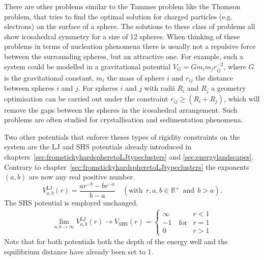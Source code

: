 There are other problems similar to the Tammes problem like the Thomson problem,
that tries to find the optimal solution for charged particles (e.g. electrons)
on the surface of a
sphere.\autocite{Wales_Structuredynamicsspherical_2006,Wales_Defectmotifsspherical_2009}
The solutions to these class of problems all show icosahedral symmetry for a
size of 12 spheres. When thinking of these problems in terms of nucleation
phenomena there is usually not a repulsive force between the surrounding
spheres, but an attractive one. For example, such a system could be modelled in
a gravitational potential $V_G=Gm_im_jr_{ij}^{-2}$, where $G$ is the gravitational
constant, $m_i$ the mass of sphere $i$ and $r_{ij}$ the distance between spheres
$i$ and $j$. For spheres $i$ and $j$ with radii $R_i$ and $R_j$ a geometry
optimisation can be carried out under the constraint $r_{ij}\geq (R_i + R_j)$,
which will remove the gaps between the spheres in the icosahedral arrangement.
Such problems are often studied for crystallisation and sedimentation
phenomena.\autocite{Levin_Crystallizationhardspheres_2000,Pusey_Hardspherescrystallization_2009}

Two other potentials that enforce theses types of rigidity constraints on the
system are the \acf{LJ} and \acf{SHS} potentials already introduced in
chapters~\ref{sec:fromstickyhardspheretoLJtypeclusters} and
\ref{sec:energylandscapes}. Contrary to
chapter~\ref{sec:fromstickyhardspheretoLJtypeclusters} the exponents $(a,b)$ are
now any real positive number.
%
\begin{equation}
    V_{a,b}^\mathrm{LJ}(r)=\frac{ar^{-b}-br^{-a}}{b-a} \quad (\mathrm{with} \ \ r,a,b \in \mathbb{R}^+ \ \ \mathrm{and} \ \ b>a).
\label{eqn:abpot}
\end{equation}
%
The \ac{SHS} potential is employed unchanged.
%
\begin{align}
    \lim_{a,b\rightarrow \infty} V_{a,b}^\mathrm{LJ}(r) \rightarrow V_\mathrm{SHS}(r)=
    \begin{cases}
        \infty   & r < 1\\
        -1  \quad \mathrm{for} & r = 1\\
        0       & r > 1
    \end{cases}
\label{eqn:KS1}
\end{align}
%
Note that for both potentials both the depth of the energy well and the
equilibrium distance have already been set to 1.

